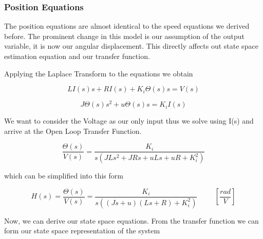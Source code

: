 	\subsubsection{Position Equations}
    The position equations are almost identical to the speed equations we derived before. The prominent change in this model is our assumption of the output variable, it is now our angular displacement. This directly affects out state space estimation equation and our transfer function.

Applying the Laplace Transform to the equations we obtain

\begin{equation}
LI(s)s + RI(s) + K_{i} \Theta(s)s = V(s)
\end{equation}

\begin{equation}
J \Theta (s) s^{2} + u \Theta (s) s = K_{i}I(s)
\end{equation}

We want to consider the Voltage as our only input thus we solve using I(s) and arrive at the Open Loop Transfer Function. 

\begin{equation}
\frac{\Theta(s)}{V(s)}  = \frac{K_{i}}{s(JLs^{2} + JRs +uLs + uR + K_{i}^{2})}
\end{equation}

\noindent which can be simplified into this form

\begin{equation}
H(s) = \frac{\Theta(s)}{V(s)}  = \frac{K_{i}}{s((Js+u)(Ls+R) + K_{i}^{2})}  \hspace{1cm} [\frac{rad}{V}]
\end{equation}

Now, we can derive our state space equations.
From the transfer function we can form our state space representation of the system

